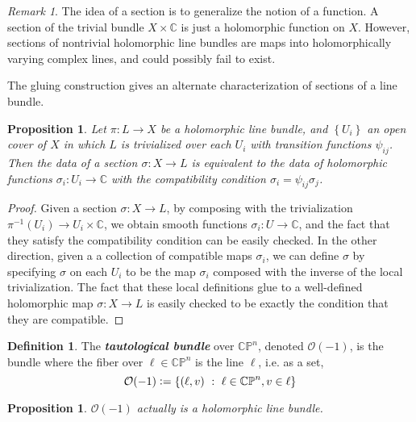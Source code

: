 \documentclass[psamsfonts, 12pt]{amsart}
\newtheorem{prop}[thm]{Proposition}
\theoremstyle{definition}
\newtheorem{defn}[thm]{Definition}
\theoremstyle{remark}
\newtheorem*{rem*}{Remark}
\renewcommand{\O}{\mathcal{O}}
\newcommand{\ib}[1]{\textbf{\textit{#1}}}
\newcommand{\C}{\mathbb{C}}
\newcommand{\CP}{\mathbb{CP}}
\newcommand{\inv}{^{-1}}
\newcommand{\set}[1]{\left\lbrace #1 \right\rbrace}
\newcommand{\defeq}{\vcentcolon=}
\begin{document}
%
\begin{rem*}
The idea of a section is to generalize the notion of a function. A section
of the trivial bundle $X \times \C$ is just a holomorphic function on $X$. However,
sections of nontrivial holomorphic line bundles are maps into holomorphically
varying complex lines, and could possibly fail to exist.
\end{rem*}
%
The gluing construction gives an alternate characterization of sections of a line bundle.
%
\begin{prop}
Let $\pi : L \to X$ be a holomorphic line bundle, and $\set{U_i}$ an open cover of
$X$ in which $L$ is trivialized over each $U_i$ with transition functions $\psi_{ij}$.
Then the data of a section $\sigma : X \to L$ is equivalent to the data
of holomorphic functions $\sigma_i : U_i \to \C$ with the compatibility condition
$\sigma_i = \psi_{ij}\sigma_j$.
\end{prop}
%
\begin{proof}
Given a section $\sigma : X \to L$, by composing with the trivialization
$\pi\inv(U_i) \to U_i \times \C$, we obtain smooth functions $\sigma_i : U \to \C$,
and the fact that they satisfy the compatibility condition can be easily checked.
In the other direction, given a a collection of compatible maps $\sigma_i$,
we can define $\sigma$ by specifying $\sigma$ on each $U_i$ to be
the map $\sigma_i$ composed with the inverse of the local trivialization.
The fact that these local definitions glue to a well-defined holomorphic map
$\sigma : X \to L$ is easily checked to be exactly the condition that they are
compatible.
\end{proof}
%
\begin{defn}
The \ib{tautological bundle} over $\CP^n$, denoted $\O(-1)$, is the bundle
where the fiber over $\ell \in \CP^n$ is the line $\ell$, i.e. as a set,
\[
\O(-1) \defeq \set{(\ell, v) ~:~ \ell \in \CP^n, v \in \ell}
\]
\end{defn}
%
\begin{prop}
$\O(-1)$ actually is a holomorphic line bundle.
\end{prop}
%
\end{document}
